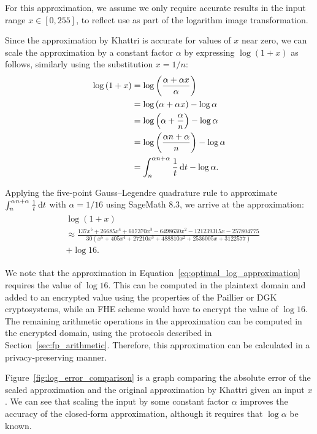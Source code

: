 For this approximation, we assume we only require accurate results in the input range $x \in [0, 255]$, to reflect use as part of the logarithm image transformation.

Since the approximation by Khattri is accurate for values of $x$ near zero, we can scale the approximation by a constant factor $\alpha$ by expressing $\log(1+x)$ as follows, similarly using the substitution $x=1/n$:
\begin{align*}
	\log{\left(1+x\right)} &= \log{\left(\frac{\alpha + \alpha x}{\alpha}\right)}\\
	&= \log{(\alpha + \alpha x)} - \log{\alpha}\\
	&= \log{\left(\alpha+\frac{\alpha}{n}\right)} - \log{\alpha}\\
	&= \log{\left(\frac{\alpha n + \alpha}{n}\right)} - \log{\alpha}\\
	&= \int_{n}^{\alpha n + \alpha}{\frac{1}{t}\mathop{}\!\mathrm{d} t} - \log{\alpha}.
\end{align*}

Applying the five-point Gauss--Legendre quadrature rule to approximate $\int_{n}^{\alpha n + \alpha}{\frac{1}{t}\mathop{}\!\mathrm{d} t}$ with $\alpha = 1/16$ using SageMath 8.3, we arrive at the approximation:
\begin{align}\label{eq:optimal_log_approximation}
	\begin{split}
		&\log\left(1+x\right) \\
		&\approx \frac{137x^5 + 26685x^4 + 617370x^3 - 6498630x^2 - 121239315x - 257804775}
		{30(x^5 + 405x^4 + 27210x^3 + 488810x^2 + 2536005x + 3122577)}\\
		&+ \log{16}.
	\end{split}
\end{align}

We note that the approximation in Equation~\ref{eq:optimal_log_approximation} requires the value of $\log{16}$. This can be computed in the plaintext domain and added to an encrypted value using the properties of the Paillier or DGK cryptosystems, while an FHE scheme would have to encrypt the value of $\log{16}$. The remaining arithmetic operations in the approximation can be computed in the encrypted domain, using the protocols described in Section~\ref{sec:fp_arithmetic}. Therefore, this approximation can be calculated in a privacy-preserving manner.

Figure~\ref{fig:log_error_comparison} is a graph comparing the absolute error of the scaled approximation and the original approximation by Khattri given an input $x$. We can see that scaling the input by some constant factor $\alpha$ improves the accuracy of the closed-form approximation, although it requires that $\log \alpha$ be known.

